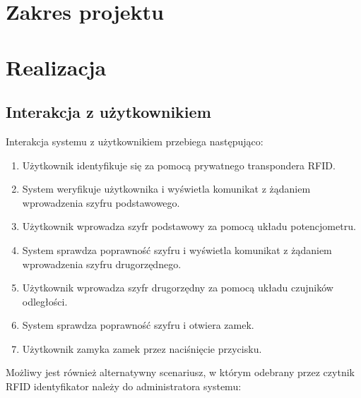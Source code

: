 \documentclass[polish,polish,a4paper]{article}
\begin{document}
	
	
	
	\section{Zakres projektu}
	
	\section{Realizacja}
	
	\subsection{Interakcja z użytkownikiem}
	Interakcja systemu z użytkownikiem przebiega następująco:
	\begin{enumerate}
		\item Użytkownik identyfikuje się za pomocą prywatnego transpondera RFID.
		\item System weryfikuje użytkownika i wyświetla komunikat z żądaniem wprowadzenia szyfru podstawowego.
		\item Użytkownik wprowadza szyfr podstawowy za pomocą układu potencjometru.
		\item System sprawdza poprawność szyfru i wyświetla komunikat z żądaniem wprowadzenia szyfru drugorzędnego.
		\item Użytkownik wprowadza szyfr drugorzędny za pomocą układu czujników odległości.
		\item System sprawdza poprawność szyfru i otwiera zamek.
		\item Użytkownik zamyka zamek przez naciśnięcie przycisku.
	\end{enumerate}
	Możliwy jest również alternatywny scenariusz, w którym odebrany przez czytnik RFID identyfikator należy do administratora systemu:
\end{document}
